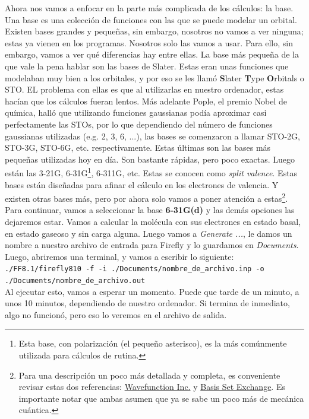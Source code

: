 \documentclass[10pt,letterpaper]{article}
\newcommand{\inlinecode}[1]{
\colorbox{light-gray}{\texttt{#1}}
}
\begin{document}
Ahora nos vamos a enfocar en la parte m\'as complicada de los c\'alculos: la base. Una base es una colecci\'on de funciones con las que se puede modelar un orbital. Existen bases grandes y peque\~nas, sin embargo, nosotros no vamos a ver ninguna; estas ya vienen en los programas. Nosotros solo las vamos a usar. Para ello, sin embargo, vamos a ver qu\'e diferencias hay entre ellas. La base m\'as peque\~na de la que vale la pena hablar son las bases de Slater. Estas eran unas funciones que modelaban muy bien a los orbitales, y por eso se les llam\'o \textbf{S}later \textbf{T}ype \textbf{O}rbitals o STO. EL problema con ellas es que al utilizarlas en nuestro ordenador, estas hac\'ian que los c\'alculos fueran lentos. M\'as adelante Pople, el premio Nobel de qu\'imica, hall\'o que utilizando funciones gaussianas pod\'ia aproximar casi perfectamente las STOs, por lo que dependiendo del n\'umero de funciones gaussianas utilizadas (e.g. 2, 3, 6, ...), las bases se comenzaron a llamar STO-2G, STO-3G, STO-6G, etc. respectivamente. Estas \'ultimas son las bases m\'as peque\~nas utilizadas hoy en d\'ia. Son bastante r\'apidas, pero poco exactas. Luego est\'an las 3-21G, 6-31G\footnote{Esta base, con polarizaci\'on (el peque\~no asterisco), es la m\'as com\'unmente utilizada para c\'alculos de rutina.}, 6-311G, etc. Estas se conocen como \emph{split valence}. Estas bases est\'an dise\~nadas para afinar el c\'alculo en los electrones de valencia. Y existen otras bases m\'as, pero por ahora solo vamos a poner atenci\'on a estas\footnote{Para una descripci\'on un poco m\'as detallada y completa, es conveniente revisar estas dos referencias: \href{https://www.wavefun.com/support/sp_compfaq/Basis_Set_FAQ.html}{Wavefunction Inc.} y \href{https://bse.pnl.gov/bse/portal}{Basis Set Exchange}. Es importante notar que ambas asumen que ya se sabe un poco m\'as de mec\'anica cu\'antica.}.\\

Para continuar, vamos a seleccionar la base \textbf{6-31G(d)} y las dem\'as opciones las dejaremos estar. Vamos a calcular la mol\'ecula con sus electrones en estado basal, en estado gaseoso y sin carga alguna. Luego vamos a \textit{Generate ...}, le damos un nombre a nuestro archivo de entrada para Firefly y lo guardamos en \textit{Documents}. Luego, abriremos una terminal, y vamos a escribir lo siguiente:\\
\inlinecode{./FF8.1/firefly810 -f -i ./Documents/nombre\_de\_archivo.inp -o ./Documents/nombre\_de\_archivo.out}\\
Al ejecutar esto, vamos a esperar un momento. Puede que tarde de un minuto, a unos 10 minutos, dependiendo de nuestro ordenador. Si termina de inmediato, algo no funcion\'o, pero eso lo veremos en el archivo de salida.\\
\end{document}
